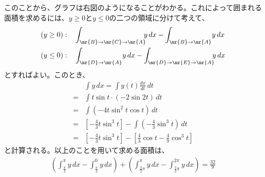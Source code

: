 このことから、グラフは右図のようになることがわかる。これによって囲まれる面積を求めるには、$y\ge 0$と$y\le 0$の二つの領域に分けて考えて、
\begin{align*}
 (y\ge 0): \quad & \int_{\mr{B}\to \mr{C}\to \mr{A}}\!\!\! y \,dx - \int_{\mr{B}\to \mr{A}}\! y \,dx \\
 (y\le 0): \quad & \int_{\mr{D}\to \mr{A}}\! y \,dx - \int_{\mr{D}\to \mr{E}\to \mr{A}}\!\!\! y \,dx
\end{align*}
とすればよい。このとき、
\begin{align*}
 &\int\! y \,dx = \int\! y(t) \frac{dx}{dt} \, dt \\
 =& \int\! t\sin t \cdot (-2\sin2t) \,dt \\
 =& \int\! (-4t\sin^2t\cos t) \,dt \\
 =& \left[-\frac{4}{3}t\sin^3t\right] - \int\! \left(-\frac{4}{3}\sin^3 t\right) \,dt \\
 =& \left[-\frac{4}{3}t\sin^3t\right] - \left[\frac{4}{3}\cos t -\frac{4}{9} \cos^3t\right]
\end{align*}
と計算される。以上のことを用いて求める面積は、
\begin{align*}
 \left(\int_{\frac{\pi}{2}}^\pi\! y \,dx - \int_{\frac{\pi}{2}}^0\! y \,dx \right) + \left(\int_{\frac{3}{2}\pi}^\pi\! y \,dx - \int_{\frac{3}{2}\pi}^{2\pi}\! y \,dx \right) = \frac{32}{9}
\end{align*}
